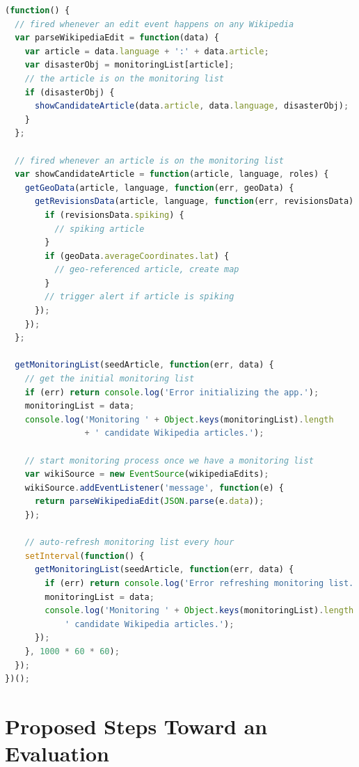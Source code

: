 \documentclass[letterpaper]{article}
\begin{document}
\begin{lstlisting}[caption={Monitoring loop of the disaster monitor},
  label=listing:monitoring, language=JavaScript,
  float=b!, stringstyle=\color{gray},morekeywords={for,if,console,log,addEventListener,JSON,parse,stringify,forEach}]
(function() {
  // fired whenever an edit event happens on any Wikipedia
  var parseWikipediaEdit = function(data) {
    var article = data.language + ':' + data.article;
    var disasterObj = monitoringList[article];
    // the article is on the monitoring list
    if (disasterObj) {    
      showCandidateArticle(data.article, data.language, disasterObj);
    }
  };
 
  // fired whenever an article is on the monitoring list
  var showCandidateArticle = function(article, language, roles) {
    getGeoData(article, language, function(err, geoData) {
      getRevisionsData(article, language, function(err, revisionsData) {
        if (revisionsData.spiking) {
          // spiking article
        }
        if (geoData.averageCoordinates.lat) {
          // geo-referenced article, create map
        }
        // trigger alert if article is spiking
      });
    });
  };  

  getMonitoringList(seedArticle, function(err, data) {
    // get the initial monitoring list
    if (err) return console.log('Error initializing the app.');
    monitoringList = data;
    console.log('Monitoring ' + Object.keys(monitoringList).length
                + ' candidate Wikipedia articles.');
    
    // start monitoring process once we have a monitoring list
    var wikiSource = new EventSource(wikipediaEdits);
    wikiSource.addEventListener('message', function(e) {
      return parseWikipediaEdit(JSON.parse(e.data));
    });
    
    // auto-refresh monitoring list every hour
    setInterval(function() {
      getMonitoringList(seedArticle, function(err, data) {
        if (err) return console.log('Error refreshing monitoring list.');
        monitoringList = data;
        console.log('Monitoring ' + Object.keys(monitoringList).length +
            ' candidate Wikipedia articles.');
      });
    }, 1000 * 60 * 60);
  });
})();
\end{lstlisting}

\section{Proposed Steps Toward an Evaluation}
\label{sec:Evaluation}
\end{document}

